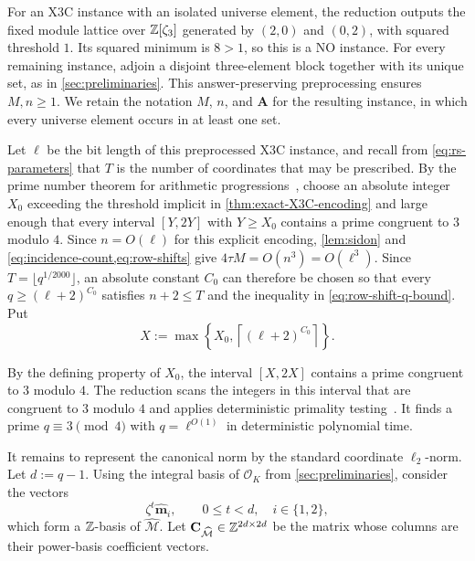 For an X3C instance with an isolated universe element, the
reduction outputs the fixed module lattice over $\mathbb Z[\zeta_3]$ generated by
$(2,0)$ and $(0,2)$, with squared threshold $1$.  Its squared minimum is
$8>1$, so this is a NO instance.  For every remaining instance,
adjoin a disjoint three-element block together with its unique set, as in
\cref{sec:preliminaries}.  This answer-preserving preprocessing ensures
$M,n\ge1$.  We retain the notation $M$, $n$, and $\mathbf A$ for the resulting
instance, in which every universe element occurs in at least one set.

Let $\ell$ be the bit length of this preprocessed X3C instance, and
recall from \cref{eq:rs-parameters} that $T$ is the number of coordinates
that may be prescribed.  By the prime number theorem for
arithmetic progressions~\cite[Equation~(17.2)]{IwaniecKowalski04}, choose an
absolute integer $X_0$ exceeding the threshold implicit in
\cref{thm:exact-X3C-encoding} and large enough that every interval $[Y,2Y]$
with $Y\ge X_0$ contains a prime congruent to $3$ modulo $4$.
Since $n=O(\ell)$ for this explicit encoding,
\cref{lem:sidon} and \cref{eq:incidence-count,eq:row-shifts} give
$4\tau M=O(n^3)=O(\ell^3)$.  Since $T=\lfloor q^{1/2000}\rfloor$, an
absolute constant $C_0$ can therefore be chosen so that every
$q\ge(\ell+2)^{C_0}$ satisfies $n+2\le T$ and
the inequality in \cref{eq:row-shift-q-bound}.  Put
\[
 X:=\max\left\{X_0,\left\lceil(\ell+2)^{C_0}\right\rceil\right\}.
\]

 By the defining property of $X_0$, the interval $[X,2X]$ contains
 a prime congruent to $3$ modulo $4$.  The reduction scans the
integers in this interval that are congruent to $3$ modulo $4$ and applies
deterministic primality testing~\cite{AgrawalKayalSaxena04}.  It finds a
prime $q\equiv3\pmod4$ with $q=\ell^{O(1)}$ in deterministic polynomial
time.

It remains to represent the canonical norm by the standard
coordinate $\ell_2$-norm.
Let $d:=q-1$.  Using the integral basis of $\mathcal{O}_K$ from
\cref{sec:preliminaries}, consider the vectors
\[
 \zeta^t\widehat{\mathbf m}_i,
 \qquad 0\le t<d,
 \quad i\in\{1,2\},
\]
which form a $\mathbb Z$-basis of $\widehat{\mathcal M}$.  Let
$\mathbf C_{\widehat{\mathcal M}}\in\mathbb Z^{2d\times2d}$ be the matrix whose
columns are their power-basis coefficient vectors.

